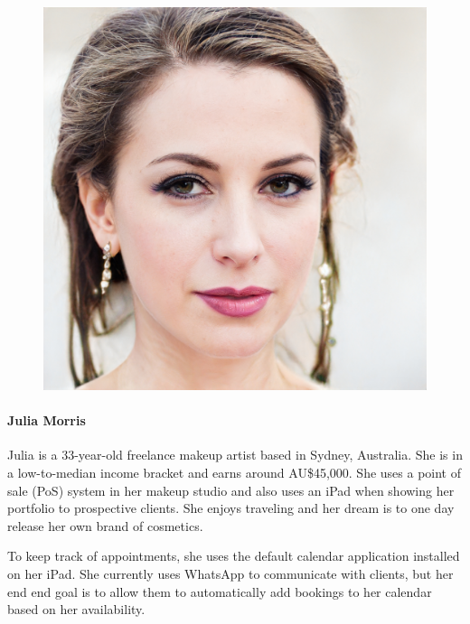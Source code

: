 \documentclass{article}
\begin{document}
\begin{figure}
	\includegraphics[scale=0.08]{persona-julia.jpg}
\end{figure}

\paragraph{Julia Morris}

Julia is a 33-year-old freelance makeup artist based in Sydney, Australia. She is in a low-to-median income bracket and earns around AU\$45,000. She uses a point of sale (PoS) system in her makeup studio and also uses an iPad when showing her portfolio to prospective clients. She enjoys traveling and her dream is to one day release her own brand of cosmetics.

To keep track of appointments, she uses the default calendar application installed on her iPad. She currently uses WhatsApp to communicate with clients, but her end end goal is to allow them to automatically add bookings to her calendar based on her availability.
\end{document}
